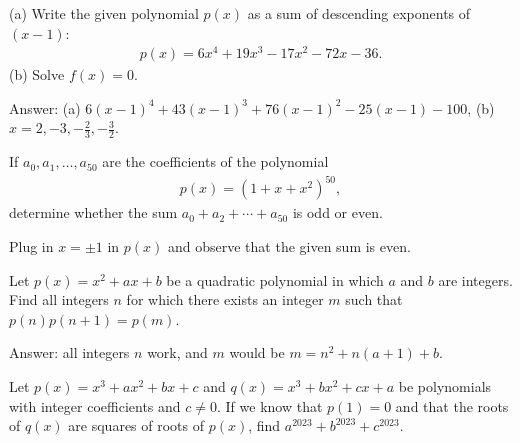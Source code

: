 \documentclass[12pt,a4paper]{memoir}
\theoremstyle{definition}
\begin{document}
\begin{tcolorbox}
	\begin{question}
		(a) Write the given polynomial $p(x)$ as a sum of descending exponents of $(x-1)$:
		\begin{align*}
			p(x) = 6x^4 + 19x^3 - 17x^2 -72x - 36.
		\end{align*}
		(b) Solve $f(x)=0$.
	\end{question}
\end{tcolorbox}

\begin{solution}[name=Solution by Parviz Shahriari]
	Answer: (a) $6(x-1)^4+43(x-1)^3+76(x-1)^2-25(x-1)-100$, (b) $x=2, -3, -\frac{2}{3}, -\frac{3}{2}$.
\end{solution}


\begin{tcolorbox}
	\begin{question}
		If $a_0,a_1,\dots,a_{50}$ are the coefficients of the polynomial
		\begin{align*}
			p(x) = (1+x+x^2)^{50},
		\end{align*}
		determine whether the sum $a_0+a_2+\cdots+a_{50}$ is odd or even.
	\end{question}
\end{tcolorbox}

\begin{solution}
	Plug in $x=\pm 1$ in $p(x)$ and observe that the given sum is even.
\end{solution}




\begin{tcolorbox}
	\begin{question}
		Let $p(x)=x^2+ax+b$ be a quadratic polynomial in which $a$ and $b$ are integers. Find all integers $n$ for which there exists an integer $m$ such that $p(n)p(n+1)=p(m)$.
	\end{question}
\end{tcolorbox}

\begin{solution}
	Answer: all integers $n$ work, and $m$ would be $m=n^2 +n(a+1) +b$.
\end{solution}




\begin{tcolorbox}
	\begin{question}
		Let $p(x)=x^3+ax^2+bx+c$ and $q(x)=x^3+bx^2+cx+a$ be polynomials with integer coefficients and $c \neq 0$. If we know that $p(1)=0$ and that the roots of $q(x)$ are squares of roots of $p(x)$, find $a^{2023} + b^{2023} + c^{2023}$.
	\end{question}
\end{tcolorbox}
\end{document}

